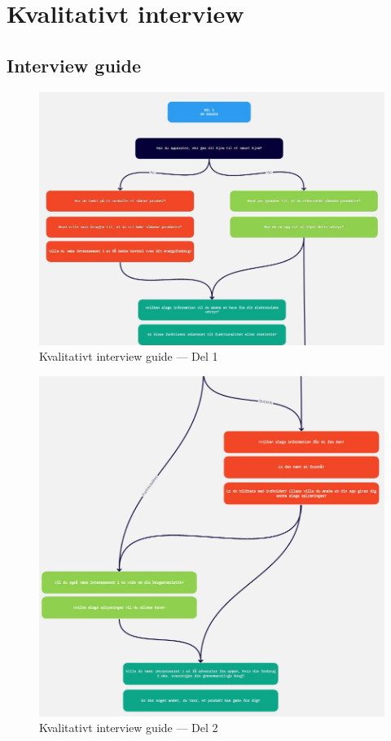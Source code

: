\chapter{Kvalitativt interview}
\label{appendix:interview}
\section{Interview guide}
\begin{figure}
    \centering
    \includegraphics[width=\textwidth]{Images/appendixB/1.jpg}
    \caption{Kvalitativt interview guide — Del 1}
    \label{img:appendixc:1}
\end{figure}

\begin{figure}
    \centering
    \includegraphics[width=\textwidth]{Images/appendixB/2.jpg}
    \caption{Kvalitativt interview guide — Del 2}
    \label{img:appendixc:2}
\end{figure}

